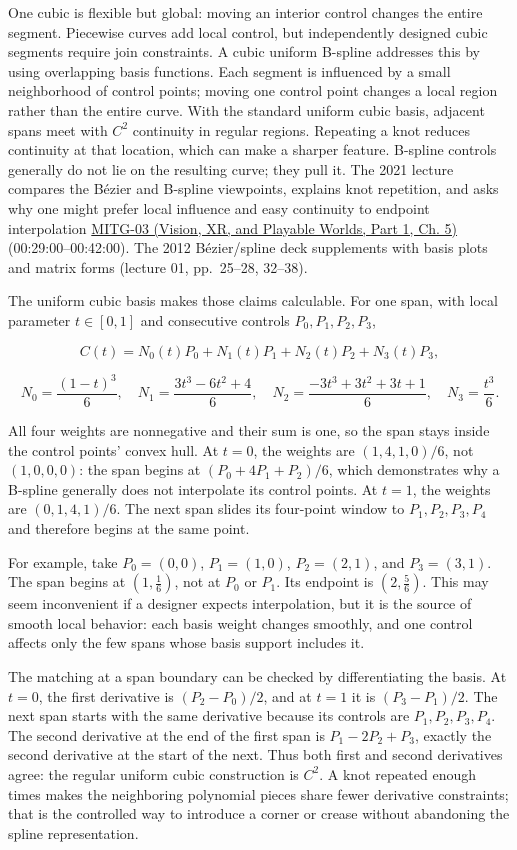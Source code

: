 One cubic is flexible but global: moving an interior control changes the entire segment. Piecewise curves add local control, but independently designed cubic segments require join constraints. A cubic uniform B-spline addresses this by using overlapping basis functions. Each segment is influenced by a small neighborhood of control points; moving one control point changes a local region rather than the entire curve. With the standard uniform cubic basis, adjacent spans meet with \(C^2\) continuity in regular regions. Repeating a knot reduces continuity at that location, which can make a sharper feature. B-spline controls generally do not lie on the resulting curve; they pull it. The 2021 lecture compares the Bézier and B-spline viewpoints, explains knot repetition, and asks why one might prefer local influence and easy continuity to endpoint interpolation \href{../07-Vision-XR-and-Playable-Worlds-P01/main.pdf\#04-visual-computing-ii-ch036-mitg-03---curves-and-surfaces}{MITG-03 (Vision, XR, and Playable Worlds, Part 1, Ch. 5)} (00:29:00--00:42:00). The 2012 Bézier/spline deck supplements with basis plots and matrix forms (lecture 01, pp.~25--28, 32--38).

The uniform cubic basis makes those claims calculable. For one span, with local parameter \(t\in[0,1]\) and consecutive controls \(P_0,P_1,P_2,P_3\),

\[
C(t)=N_0(t)P_0+N_1(t)P_1+N_2(t)P_2+N_3(t)P_3,
\]

\[
N_0=\frac{(1-t)^3}{6},\quad N_1=\frac{3t^3-6t^2+4}{6},\quad
N_2=\frac{-3t^3+3t^2+3t+1}{6},\quad N_3=\frac{t^3}{6}.
\]

All four weights are nonnegative and their sum is one, so the span stays inside the control points' convex hull. At \(t=0\), the weights are \((1,4,1,0)/6\), not \((1,0,0,0)\): the span begins at \((P_0+4P_1+P_2)/6\), which demonstrates why a B-spline generally does not interpolate its control points. At \(t=1\), the weights are \((0,1,4,1)/6\). The next span slides its four-point window to \(P_1,P_2,P_3,P_4\) and therefore begins at the same point.

For example, take \(P_0=(0,0)\), \(P_1=(1,0)\), \(P_2=(2,1)\), and \(P_3=(3,1)\). The span begins at \((1,\frac16)\), not at \(P_0\) or \(P_1\). Its endpoint is \((2,\frac56)\). This may seem inconvenient if a designer expects interpolation, but it is the source of smooth local behavior: each basis weight changes smoothly, and one control affects only the few spans whose basis support includes it.

The matching at a span boundary can be checked by differentiating the basis. At \(t=0\), the first derivative is \((P_2-P_0)/2\), and at \(t=1\) it is \((P_3-P_1)/2\). The next span starts with the same derivative because its controls are \(P_1,P_2,P_3,P_4\). The second derivative at the end of the first span is \(P_1-2P_2+P_3\), exactly the second derivative at the start of the next. Thus both first and second derivatives agree: the regular uniform cubic construction is \(C^2\). A knot repeated enough times makes the neighboring polynomial pieces share fewer derivative constraints; that is the controlled way to introduce a corner or crease without abandoning the spline representation.

